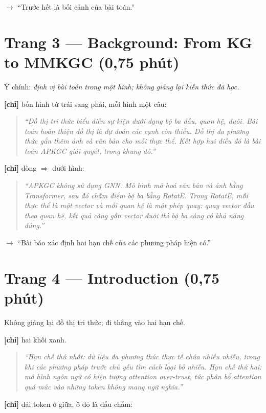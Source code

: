 \documentclass[11pt,a4paper]{article}
\begin{document}
\textbf{$\to$} ``Trước hết là bối cảnh của bài toán.''


\section*{Trang 3 --- Background: From KG to MMKGC (0,75 phút)}

Ý chính: \emph{định vị bài toán trong một hình; không giảng lại kiến thức đã học.}


\textbf{[chỉ]} bốn hình từ trái sang phải, mỗi hình một câu:


\begin{quote}\itshape ``Đồ thị tri thức biểu diễn sự kiện dưới dạng bộ ba đầu, quan hệ, đuôi. Bài toán hoàn thiện đồ thị là dự đoán các cạnh còn thiếu. Đồ thị đa phương thức gắn thêm ảnh và văn bản cho mỗi thực thể. Kết hợp hai điều đó là bài toán APKGC giải quyết, trong khung đỏ.''\end{quote}

\textbf{[chỉ]} dòng \ensuremath{\Rightarrow} dưới hình:


\begin{quote}\itshape ``APKGC không sử dụng GNN. Mô hình mã hoá văn bản và ảnh bằng Transformer, sau đó chấm điểm bộ ba bằng RotatE. Trong RotatE, mỗi thực thể là một vector và mỗi quan hệ là một \emph{phép quay}: quay vector đầu theo quan hệ, kết quả càng gần vector đuôi thì bộ ba càng có khả năng đúng.''\end{quote}

\textbf{$\to$} ``Bài báo xác định hai hạn chế của các phương pháp hiện có.''


\section*{Trang 4 --- Introduction (0,75 phút)}

Không giảng lại đồ thị tri thức; đi thẳng vào hai hạn chế.


\textbf{[chỉ]} hai khối xanh.


\begin{quote}\itshape ``Hạn chế thứ nhất: dữ liệu đa phương thức thực tế chứa nhiều nhiễu, trong khi các phương pháp trước chủ yếu tìm cách loại bỏ nhiễu. Hạn chế thứ hai: mô hình ngôn ngữ có hiện tượng \emph{attention over-trust}, tức phân bổ attention quá mức vào những token không mang ngữ nghĩa.''\end{quote}

\textbf{[chỉ]} dải token ở giữa, ô đỏ là dấu chấm:
\end{document}
